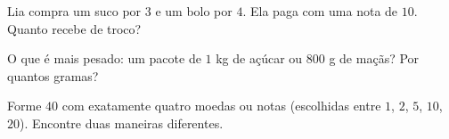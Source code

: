 \begin{exercise}[$\star$]\label{exo:g2:measure:8}
Lia compra um suco por $3$ e um bolo por $4$. Ela paga com uma nota
de $10$. Quanto recebe de troco?
\end{exercise}

\begin{exercise}[$\star$]\label{exo:g2:measure:9}
O que é mais pesado: um pacote de $1$ kg de açúcar ou $800$ g de
maçãs? Por quantos gramas?
\end{exercise}

\begin{exercise}[$\star\star$]\label{exo:g2:measure:10}
Forme $40$ com exatamente quatro moedas ou notas (escolhidas entre
$1$, $2$, $5$, $10$, $20$). Encontre duas maneiras diferentes.
\end{exercise}

